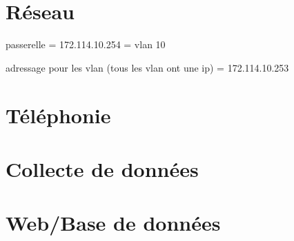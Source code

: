 \documentclass[12pt, a4paper]{article}
\begin{document}
\newpage
\section{Réseau}

passerelle = 172.114.10.254 = vlan 10

adressage pour les vlan (tous les vlan ont une ip) = 172.114.10.253



\newpage
\section{Téléphonie}


\newpage
\section{Collecte de données}


\newpage
\section{Web/Base de données}
\end{document}
